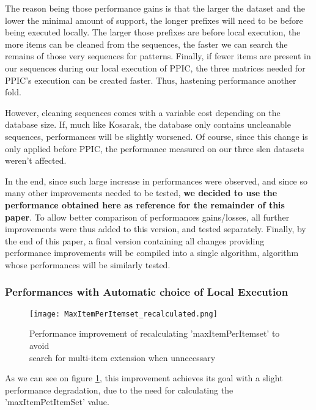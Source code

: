 \documentclass{eplmastersthesis}
\begin{document}
The reason being those performance gains is that the larger the dataset and the lower the minimal amount of support, the longer prefixes will need to be before being executed locally. The larger those prefixes are before local execution, the more items can be cleaned from the sequences, the faster we can search the remains of those very sequences for patterns. Finally, if fewer items are present in our sequences during our local execution of PPIC, the three matrices needed for PPIC's execution can be created faster. Thus, hastening performance another fold. \newline

However, cleaning sequences comes with a variable cost depending on the database size. If, much like Kosarak, the database only contains uncleanable sequences, performances will be slightly worsened. Of course, since this change is only applied before PPIC, the performance measured on our three slen datasets weren't affected. \newline

In the end, since such large increase in performances were observed, and since so many other improvements needed to be tested, \textbf{we decided to use the performance obtained here as reference for the remainder of this paper}. To allow better comparison of performances gains/losses, all further improvements were thus added to this version, and tested separately. Finally, by the end of this paper, a final version containing all changes providing performance improvements will be compiled into a single algorithm, algorithm whose performances will be similarly tested.

\subsubsection{Performances with Automatic choice of Local Execution}

\begin{figure}[h]
  \centering
  \texttt{[image: MaxItemPerItemset\_recalculated.png]}
  \caption[Automatic detection of item-sets type in dataset]{
		Performance improvement of recalculating 'maxItemPerItemset' to avoid \\
		search for multi-item extension when unnecessary
	\endtabular}
  \label{fig:maxItemPerItemset_recalculated}
\end{figure}

As we can see on figure \ref{fig:maxItemPerItemset_recalculated}, this improvement achieves its goal with a slight performance degradation, due to the need for calculating the 'maxItemPetItemSet' value. \newline
\end{document}
